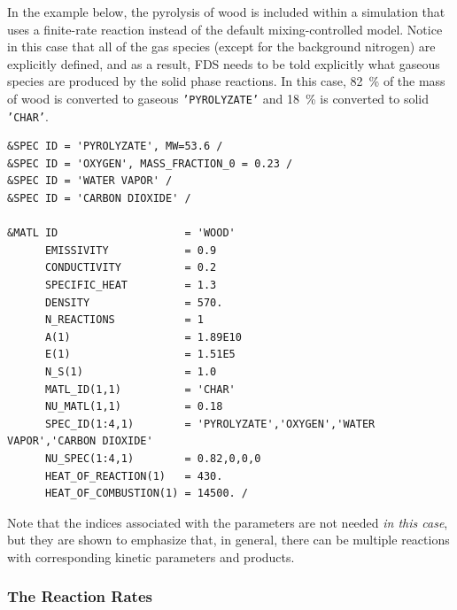 \documentclass[11pt]{book}
\newcommand{\ct}{\tt\small}
\begin{document}
In the example below, the pyrolysis of wood is included within a simulation that uses
a finite-rate reaction instead of the default mixing-controlled model. Notice in this case that
all of the gas species (except for the background nitrogen) are explicitly defined, and as a result, FDS
needs to be told explicitly what gaseous species are produced by the solid phase reactions. In this case, 82~\% of the
mass of wood is converted to gaseous {\ct 'PYROLYZATE'} and 18~\% is converted to solid {\ct 'CHAR'}.

\footnotesize
\begin{verbatim}
&SPEC ID = 'PYROLYZATE', MW=53.6 /
&SPEC ID = 'OXYGEN', MASS_FRACTION_0 = 0.23 /
&SPEC ID = 'WATER VAPOR' /
&SPEC ID = 'CARBON DIOXIDE' /

&MATL ID                    = 'WOOD'
      EMISSIVITY            = 0.9
      CONDUCTIVITY          = 0.2
      SPECIFIC_HEAT         = 1.3
      DENSITY               = 570.
      N_REACTIONS           = 1
      A(1)                  = 1.89E10
      E(1)                  = 1.51E5
      N_S(1)                = 1.0
      MATL_ID(1,1)          = 'CHAR'
      NU_MATL(1,1)          = 0.18
      SPEC_ID(1:4,1)        = 'PYROLYZATE','OXYGEN','WATER VAPOR','CARBON DIOXIDE'
      NU_SPEC(1:4,1)        = 0.82,0,0,0
      HEAT_OF_REACTION(1)   = 430.
      HEAT_OF_COMBUSTION(1) = 14500. /
\end{verbatim} \normalsize

\noindent Note that the indices associated with the parameters are not needed {\em in this case}, but they are shown to emphasize that, in general, there can
be multiple reactions with corresponding kinetic parameters and products.

\subsubsection{The Reaction Rates}
\end{document}
